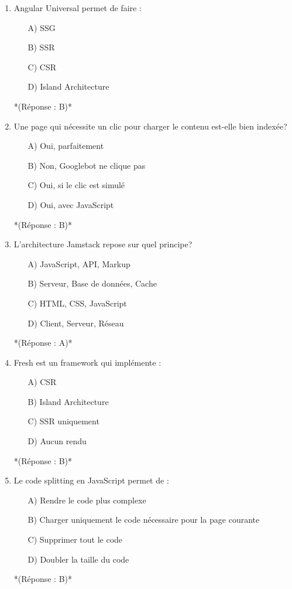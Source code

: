 \documentclass[12pt,a4paper,twoside]{report}
\begin{document}
\begin{enumerate}
\item Angular Universal permet de faire :
\begin{itemize}
\item[A)] SSG
\item[B)] SSR
\item[C)] CSR
\item[D)] Island Architecture
\end{itemize}
*(Réponse : B)*

\item Une page qui nécessite un clic pour charger le contenu est-elle bien indexée?
\begin{itemize}
\item[A)] Oui, parfaitement
\item[B)] Non, Googlebot ne clique pas
\item[C)] Oui, si le clic est simulé
\item[D)] Oui, avec JavaScript
\end{itemize}
*(Réponse : B)*

\item L'architecture Jamstack repose sur quel principe?
\begin{itemize}
\item[A)] JavaScript, API, Markup
\item[B)] Serveur, Base de données, Cache
\item[C)] HTML, CSS, JavaScript
\item[D)] Client, Serveur, Réseau
\end{itemize}
*(Réponse : A)*

\item Fresh est un framework qui implémente :
\begin{itemize}
\item[A)] CSR
\item[B)] Island Architecture
\item[C)] SSR uniquement
\item[D)] Aucun rendu
\end{itemize}
*(Réponse : B)*

\item Le code splitting en JavaScript permet de :
\begin{itemize}
\item[A)] Rendre le code plus complexe
\item[B)] Charger uniquement le code nécessaire pour la page courante
\item[C)] Supprimer tout le code
\item[D)] Doubler la taille du code
\end{itemize}
*(Réponse : B)*


\end{enumerate}
\end{document}
